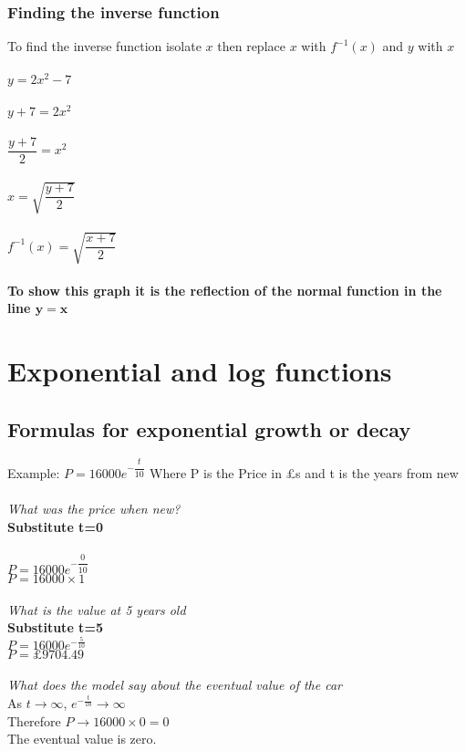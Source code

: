 \documentclass{article}[18pt]
\begin{document}
\subsubsection{Finding the inverse function}
To find the inverse function isolate $x$ then replace $x$ with $f^{-1}(x)$ and $y$ with $x$\\
\\
$y=2x^2-7$\\
\\
$y+7=2x^2$\\
\\
$\dfrac{y+7}{2}=x^2$\\
\\
$x=\sqrt{\dfrac{y+7}{2}}$\\
\\
$f^{-1}(x)=\sqrt{\dfrac{x+7}{2}}$\\
\\
\textbf{To show this graph it is the reflection of the normal function in the line $\mathbf{y=x}$}
\section{Exponential and log functions}
\subsection{Formulas for exponential growth or decay}
Example:
$P=16000e^{-\dfrac{t}{10}}$
Where P is the Price in £s and t is the years from new\\
\\
\textit{What was the price when new?}\\
\textbf{Substitute t=0}\\
\\
$P=16000e^{-\dfrac{0}{10}}$\\
$P=16000 \times 1$\\
\\
\textit{What is the value at 5 years old}\\
\textbf{Substitute t=5}\\
$P=16000e^{-\frac{5}{10}}$\\
$P=\mathsterling 9704.49$\\
\\
\textit{What does the model say about the eventual value of the car}\\
As $t \rightarrow \infty$, $e^{-\frac{t}{10}} \rightarrow \infty$\\
Therefore $P \rightarrow 16000 \times 0 = 0$\\
The eventual value is zero.
\end{document}
